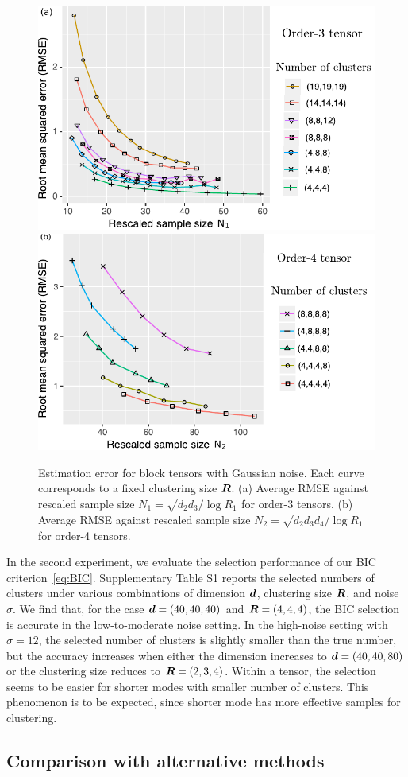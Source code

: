 \documentclass{article}
\begin{document}
\begin{figure}[H]
\centering
\includegraphics[width=.4\textwidth]{figure.pdf}
\includegraphics[width=.4\textwidth]{rescale_order4.pdf}
\caption{\small Estimation error for block tensors with Gaussian noise. Each curve corresponds to a fixed clustering size $\bm{R}$. (a) Average RMSE against rescaled sample size $N_1=\sqrt{d_2d_3/\log R_1}$ for order-3 tensors. (b) Average RMSE against rescaled sample size $N_2=\sqrt{d_2d_3d_4/\log R_1}$ for order-4 tensors. 
}\label{fig:RMSE}
\end{figure}
\vspace{-.5cm}

In the second experiment, we evaluate the selection performance of our BIC criterion~\eqref{eq:BIC}. Supplementary Table S1 reports the selected numbers of clusters under various combinations of dimension $\bm{d}$, clustering size $\bm{R}$, and noise $\sigma$. We find that, for the case $\bm{d}=(40,40,40)$ and $\bm{R}=(4,4,4)$, the BIC selection is accurate in the low-to-moderate noise setting. In the high-noise setting with $\sigma=12$, the selected number of clusters is slightly smaller than the true number, but the accuracy increases when either the dimension increases to $\bm{d}=(40,40,80)$ or the clustering size reduces to $\bm{R}=(2,3,4)$. Within a tensor, the selection seems to be easier for shorter modes with smaller number of clusters. This phenomenon is to be expected, since shorter mode has more effective samples for clustering. 

\vspace{-.5cm}
\subsection{Comparison with alternative methods}
\end{document}
